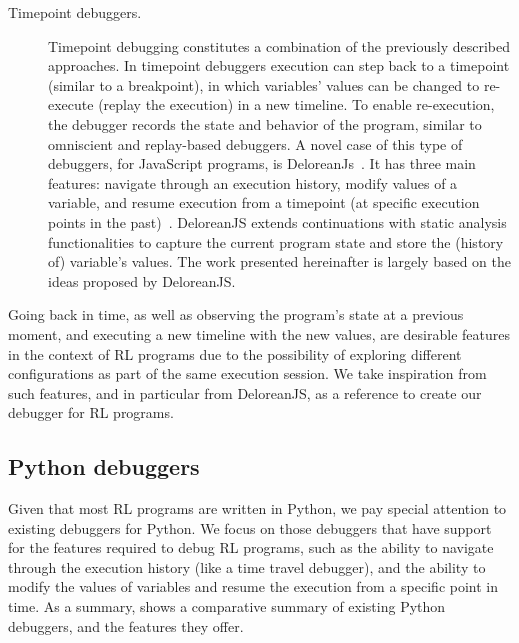 \begin{description}
\item[Timepoint debuggers.] Timepoint debugging constitutes a combination of the previously 
described approaches. In timepoint debuggers execution can step back to a timepoint (similar to a 
breakpoint), in which variables' values can be changed to re-execute (\ie replay the execution) in a 
new timeline. To enable re-execution, the debugger records the state and behavior of the program, 
similar to omniscient and replay-based debuggers. A novel case of this type of debuggers, for 
JavaScript programs, is DeloreanJs~\cite{leger23}. It has three main features:  navigate 
through an execution history, modify values of a variable, and resume execution from a timepoint (at 
specific execution points in the past)~\cite{leger23}. DeloreanJS extends continuations with static 
analysis functionalities to capture the current program state and store the (history of) variable's 
values. The work presented hereinafter is largely based on the ideas proposed by DeloreanJS.
\end{description}

Going back in time,  as well as observing the program's state at a previous moment, and executing a new timeline with the new values, are desirable features in the context of \ac{RL} programs due to the possibility of exploring different 
configurations as part of the same execution session. We take inspiration from such features,
and in particular from DeloreanJS, as a reference to create our debugger for \ac{RL} programs.


\subsection{Python debuggers}
\label{sec:py}

Given that  most \ac{RL} programs are written in Python, we pay special attention to existing 
debuggers for Python.  We focus on those debuggers
that have support for the features required to debug \ac{RL} programs, such as the ability to navigate 
through the execution history (like a time travel debugger), and the ability to modify the values
of variables and resume the execution from a specific point in time. As a summary,  shows a comparative summary of existing Python debuggers, and the 
features they offer. 



